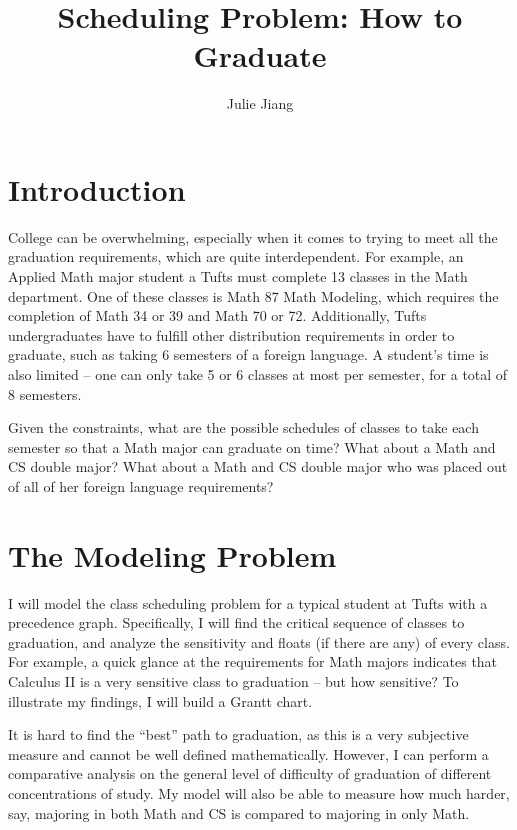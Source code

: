 \documentclass[11pt, oneside]{article}      %
\title{Scheduling Problem: How to Graduate}
\author{Julie Jiang}
\begin{document}
\maketitle
\section{Introduction}
College can be overwhelming, especially when it comes to trying to meet all the graduation requirements, which are quite interdependent. For example, an Applied Math major student a Tufts must complete 13 classes in the Math department. One of these classes is Math 87 Math Modeling, which requires the completion of Math 34 or 39 and Math 70 or 72. Additionally, Tufts undergraduates have to fulfill other distribution requirements in order to graduate, such as taking 6 semesters of a foreign language. A student's time is also limited -- one can only take 5 or 6 classes at most per semester, for a total of 8 semesters. \par
Given the constraints, what are the possible schedules of classes to take each semester so that a Math major can graduate on time? What about a Math and CS double major? What about a Math and CS double major who was placed out of all of her foreign language requirements?
\section{The Modeling Problem}
I will model the class scheduling problem for a typical student at Tufts with a precedence graph. Specifically, I will find the critical sequence of classes to graduation, and analyze the sensitivity and floats (if there are any) of every class. For example, a quick glance at the requirements for Math majors indicates that Calculus II is a very sensitive class to graduation -- but how sensitive? To illustrate my findings, I will build a Grantt chart. 

It is hard to find the ``best'' path to graduation, as this is a very subjective measure and cannot be well defined mathematically. However, I can perform a comparative analysis on the general level of difficulty of graduation of different concentrations of study. My model will also be able to measure how much harder, say, majoring in both Math and CS is compared to majoring in only Math.
\end{document}
